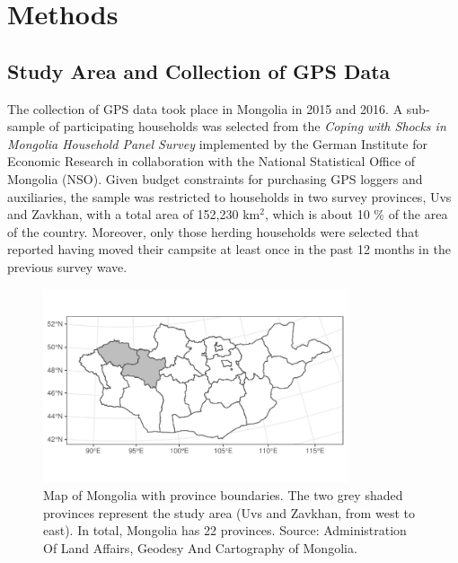 \documentclass[]{elsarticle} %
\begin{document}
\hypertarget{methods}{%
\section{Methods}\label{methods}}

\hypertarget{study-area-and-collection-of-gps-data}{%
\subsection{Study Area and Collection of GPS
Data}\label{study-area-and-collection-of-gps-data}}

The collection of GPS data took place in Mongolia in 2015 and 2016. A
sub-sample of participating households was selected from the
\emph{Coping with Shocks in Mongolia Household Panel Survey} implemented
by the German Institute for Economic Research in collaboration with the
National Statistical Office of Mongolia (NSO). Given budget constraints
for purchasing GPS loggers and auxiliaries, the sample was restricted to
households in two survey provinces, Uvs and Zavkhan, with a total area
of 152,230 km\(^2\), which is about 10 \% of the area of the country.
Moreover, only those herding households were selected that reported
having moved their campsite at least once in the past 12 months in the
previous survey wave.

\begin{figure}[H]

{\centering \includegraphics[width=0.8\textwidth]{../figures/aimags-map-1} 

}

\caption{Map of Mongolia with province boundaries. The two grey shaded provinces represent the study area (Uvs and Zavkhan, from west to east). In total, Mongolia has 22 provinces. Source: Administration Of Land Affairs, Geodesy And Cartography of Mongolia.}\label{fig:aimags-map}
\end{figure}
\end{document}
